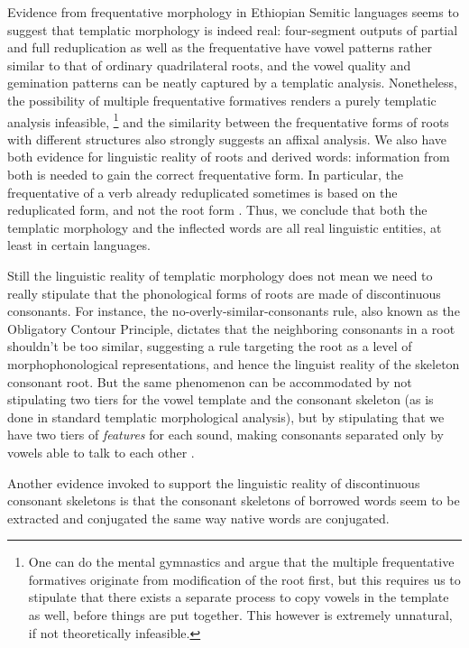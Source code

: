 \documentclass[a4paper, oneside, 12pt]{report}
\begin{document}
Evidence from frequentative morphology in Ethiopian Semitic languages
seems to suggest that templatic morphology is indeed real:
four-segment outputs of partial and full reduplication as well as the frequentative
have vowel patterns rather similar to that of ordinary quadrilateral roots,
and the vowel quality and gemination patterns can be neatly captured by a templatic analysis.
Nonetheless, the possibility of multiple frequentative formatives renders 
a purely templatic analysis infeasible,%
\footnote{
    One can do the mental gymnastics and argue that the multiple frequentative formatives
    originate from modification of the root first,
    but this requires us to stipulate that there exists a separate process
    to copy vowels in the template as well,
    before things are put together.
    This however is extremely unnatural, if not theoretically infeasible.
}
and the similarity between the frequentative forms of roots with different structures
also strongly suggests an affixal analysis.
We also have both evidence for linguistic reality of roots and derived words:
information from both is needed to gain the correct frequentative form.
In particular, the frequentative of a verb already reduplicated 
sometimes is based on the reduplicated form, and not the root form
\citep{rose2008formation}.
Thus, we conclude that both the templatic morphology
and the inflected words are all real linguistic entities,
at least in certain languages.

Still the linguistic reality of templatic morphology
does not mean we need to really stipulate that the phonological forms of roots
are made of discontinuous consonants.
For instance, the no-overly-similar-consonants rule,
also known as the Obligatory Contour Principle,
dictates that the neighboring consonants in a root shouldn't be too similar,
suggesting a rule targeting the root as a level of morphophonological representations,
and hence the linguist reality of the skeleton consonant root.
But the same phenomenon can be accommodated by
not stipulating two tiers for the vowel template and the consonant skeleton
(as is done in standard templatic morphological analysis),
but by stipulating that we have two tiers of \emph{features} for each sound,
making consonants separated only by vowels able to talk to each other \citep{bat20082}.
 
Another evidence invoked to support the linguistic reality of discontinuous consonant skeletons
is that the consonant skeletons of borrowed words seem to be 
extracted and conjugated the same way native words are conjugated.
\end{document}
